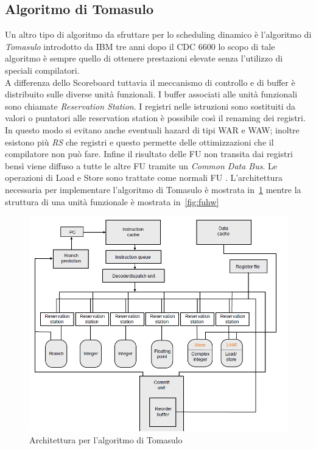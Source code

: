 \subsection{Algoritmo di Tomasulo}
Un altro tipo di algoritmo da sfruttare per lo scheduling dinamico è l'algoritmo di \emph{Tomasulo} introdotto da IBM tre anni dopo il CDC 6600 lo scopo di tale algoritmo è sempre quello di ottenere prestazioni elevate senza l'utilizzo di speciali compilatori.\\
A differenza dello Scoreboard tuttavia il meccanismo di controllo e di buffer è distribuito sulle diverse unità funzionali. I buffer associati alle unità funzionali sono chiamate \emph{Reservation Station}. I registri nelle istruzioni sono sostituiti da valori o puntatori alle reservation station è possibile così il renaming dei registri. In questo modo si evitano anche eventuali hazard di tipi WAR e WAW; inoltre esistono più \emph{RS} che registri e questo permette delle ottimizzazioni che il compilatore non può fare. Infine il risultato delle FU non transita dai registri bensì viene diffuso a tutte le altre FU tramite un \emph{Common Data Bus}. Le operazioni di Load e Store sono trattate come normali FU . L'architettura necessaria per implementare l'algoritmo di Tomasulo è mostrata in \figurename\,\ref{fig:tomahw} mentre la struttura di una unità funzionale è mostrata in \figurename\,\ref{fig:fuhw}
\begin{figure}
\centering
\includegraphics[scale=0.5]{img/tomahw.png}
\caption{Architettura per l'algoritmo di Tomasulo}\label{fig:tomahw}
\end{figure}

